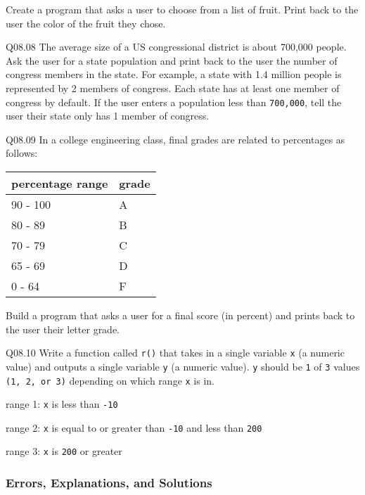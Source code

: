 \documentclass{book}
\newenvironment{problems}{}{}  %
\newcommand{\passthrough}[1]{#1}
\begin{document}
\begin{problems}
Create a program that asks a user to choose from a list of fruit. Print
back to the user the color of the fruit they chose.

Q08.08 The average size of a US congressional district is about 700,000
people. Ask the user for a state population and print back to the user
the number of congress members in the state. For example, a state with
1.4 million people is represented by 2 members of congress. Each state
has at least one member of congress by default. If the user enters a
population less than \passthrough{\lstinline!700,000!}, tell the user
their state only has 1 member of congress.

Q08.09 In a college engineering class, final grades are related to
percentages as follows:

\begin{longtable}[]{@{}ll@{}}
\toprule
percentage range & grade\tabularnewline
\midrule
\endhead
90 - 100 & A\tabularnewline
80 - 89 & B\tabularnewline
70 - 79 & C\tabularnewline
65 - 69 & D\tabularnewline
0 - 64 & F\tabularnewline
\bottomrule
\end{longtable}

Build a program that asks a user for a final score (in percent) and
prints back to the user their letter grade.

Q08.10 Write a function called \passthrough{\lstinline!r()!} that takes
in a single variable \passthrough{\lstinline!x!} (a numeric value) and
outputs a single variable \passthrough{\lstinline!y!} (a numeric value).
\passthrough{\lstinline!y!} should be \passthrough{\lstinline!1!} of
\passthrough{\lstinline!3!} values
\passthrough{\lstinline!(1, 2, or 3)!} depending on which range
\passthrough{\lstinline!x!} is in.

range 1: \passthrough{\lstinline!x!} is less than
\passthrough{\lstinline!-10!}

range 2: \passthrough{\lstinline!x!} is equal to or greater than
\passthrough{\lstinline!-10!} and less than
\passthrough{\lstinline!200!}

range 3: \passthrough{\lstinline!x!} is \passthrough{\lstinline!200!} or
greater
        \end{problems}

    




    
        \hypertarget{errors-explanations-and-solutions}{%
\subsubsection{Errors, Explanations, and
Solutions}\label{errors-explanations-and-solutions}}
\end{document}
